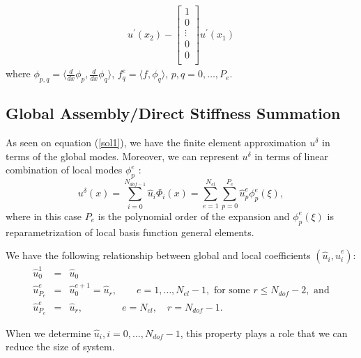 \begin{eqnarray}
u^{\prime}(x_2)
-
\begin{bmatrix}
    1       \\
    0       \\
    \vdots  \\
    0       \\
    0       \\
\end{bmatrix}
u^{\prime}(x_1)
\end{eqnarray}
where $\phi_{p,q} = \langle \frac{d}{dx} \phi_p, \frac{d}{dx} \phi_q \rangle$, $f_q^e = \langle f, \phi_q \rangle$, $p, q = 0, \ldots, P_e $.


\subsection{Global Assembly/Direct Stiffness Summation} As seen on
equation (\ref{sol1}), we have the finite element approximation
$u^{\delta}$ in terms of the global modes. Moreover, we can
represent $u^{\delta}$ in terms of linear combination of local
modes ${\phi_p^e}$ :
\begin{equation}
\label{sol2} u^{\delta}(x) = \sum_{i=0}^{N_{dof-1}}\hat u_i \Phi_i(x) = \sum_{e=1}^{N_{el}}\sum_{p=0}^{P_e}{\hat u}_p^e \phi_p^e(\xi),
\end{equation}
where in this case $P_e$ is the polynomial order of the expansion and $\phi_p^e(\xi)$ is reparametrization of local basis function general elements.

We have the following relationship between global and local coefficients $(\hat u_i,\hat u_i^e)$:
\begin{eqnarray}
\label{coefoverlap}
\hat u_0^1 &=& \hat u_0 \\
\hat u_{P_{e}}^{e} &=& \hat u_{0}^{e+1} = \hat u_r, \qquad e = 1, \ldots, N_{el}-1, \mbox{ for some } r \le N_{dof}-2, \mbox{ and}\\
\hat u_{P_{e}}^{e} &=& \hat u_r, \qquad \qquad e = N_{el},\quad r = N_{dof}-1.
\end{eqnarray}

When we determine $\hat u_i, i = 0, \ldots, N_{dof}-1$, this
property plays a role that we can reduce the size of system.

